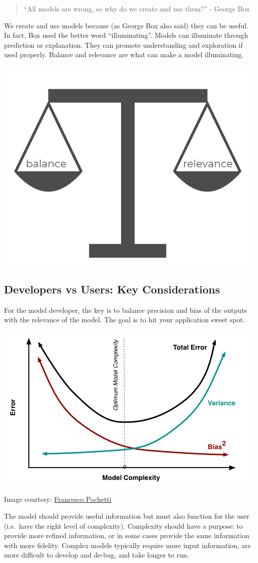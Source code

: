 \documentclass[
]{article}
\begin{document}
\begin{quote}
``All models are wrong, so why do we create and use them?'' - George Box
\end{quote}

We create and use models because (as George Box also said) they can be
useful. In fact, Box used the better word ``illuminating''. Models can
illuminate through prediction or explanation. They can promote
understanding and exploration if used properly. Balance and relevance
are what can make a model illuminating.

\includegraphics[width=0.55\linewidth]{images/balance-relevance}

\hypertarget{developers-vs-users-key-considerations}{%
\subsection{Developers vs Users: Key
Considerations}\label{developers-vs-users-key-considerations}}

For the model developer, the key is to balance precision and bias of the
outputs with the relevance of the model. The goal is to hit your
application sweet spot.

\includegraphics[width=0.55\linewidth]{images/model-complexity}

Image courtesy: \href{francescopochetti.com}{Francesco Pochetti}

The model should provide useful information but must also function for
the user (i.e.~have the right level of complexity). Complexity should
have a purpose: to provide more refined information, or in some cases
provide the same information with more fidelity. Complex models
typically require more input information, are more difficult to develop
and de-bug, and take longer to run.
\end{document}
